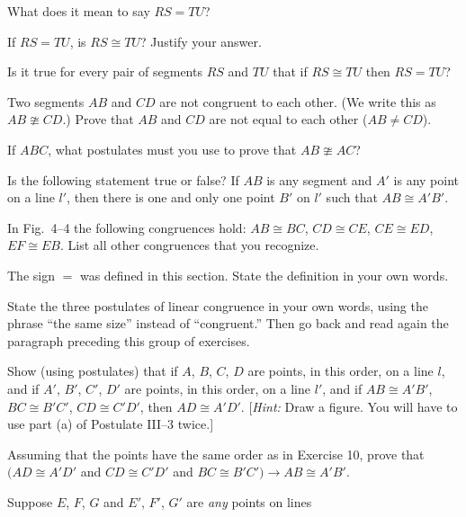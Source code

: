 \documentclass[11pt]{book}
\theoremstyle{bkplain}
\theoremstyle{XIplainnote}
\theoremstyle{bkplain}
\theoremstyle{bkplain}
\begin{document}
\begin{exercisecols}
\begin{exlist}
\item What does it mean to say $RS = TU$?
\item If $RS = TU$, is $RS \cong TU$? Justify your answer.
\item Is it true for every pair of segments $RS$ and $TU$ that if
      $RS \cong TU$ then $RS = TU$?
\item Two segments $AB$ and $CD$ are not congruent to each other. (We write this
      as $AB \ncong CD$.) Prove that $AB$ and $CD$ are not equal to each other
      ($AB \neq CD$).
\item If $ABC$, what postulates must you use to prove that $AB \ncong AC$?
\item Is the following statement true or false? If $AB$ is any segment and $A'$
      is any point on a line $l'$, then there is one and only one point $B'$ on
      $l'$ such that $AB \cong A'B'$.
\item In Fig.~4--4 the following congruences hold: $AB \cong BC$,
      $CD \cong CE$, $CE \cong ED$, $EF \cong EB$. List all other congruences
      that you recognize.
\exfig{\FIGIVFOUR}
\item The sign $=$ was defined in this section. State the definition in your own
      words.
\item State the three postulates of linear congruence in your own words, using
      the phrase ``the same size'' instead of ``congruent.'' Then go back and
      read again the paragraph preceding this group of exercises.
\item Show (using postulates) that if $A$, $B$, $C$, $D$ are points, in this
      order, on a line $l$, and if $A'$, $B'$, $C'$, $D'$ are points, in this
      order, on a line $l'$, and if $AB \cong A'B'$, $BC \cong B'C'$,
      $CD \cong C'D'$, then $AD \cong A'D'$. [\emph{Hint:} Draw a figure. You
      will have to use part (a) of Postulate III--3 twice.]
\item Assuming that the points have the same order as in Exercise 10, prove that
      $(AD \cong A'D'$ and $CD \cong C'D'$ and
      $BC \cong B'C') \rightarrow AB \cong A'B'$.
\item Suppose $E$, $F$, $G$ and $E'$, $F'$, $G'$ are \emph{any} points on lines

\end{exlist}
\end{exercisecols}
\end{document}
